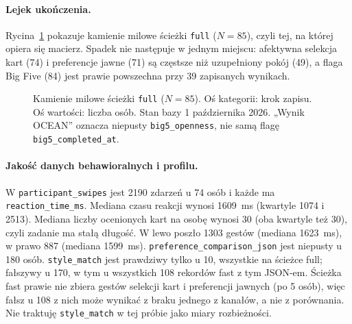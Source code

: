\paragraph{Lejek ukończenia.}
Rycina~\ref{fig:ch08:funnel} pokazuje kamienie milowe ścieżki \texttt{full} ($N=85$), czyli tej, na której opiera się macierz. Spadek nie następuje w jednym miejscu: afektywna selekcja kart (74) i preferencje jawne (71) są częstsze niż uzupełniony pokój (49), a flaga Big Five (84) jest prawie powszechna przy 39 zapisanych wynikach.

\begin{figure}[htbp]
  \centering
  \caption{Kamienie milowe ścieżki \texttt{full} ($N=85$). Oś kategorii: krok zapisu. Oś wartości: liczba osób. Stan bazy 1 października 2026. „Wynik OCEAN” oznacza niepusty \texttt{big5\_openness}, nie samą flagę \texttt{big5\_completed\_at}.}
  \label{fig:ch08:funnel}
\end{figure}

\paragraph{Jakość danych behawioralnych i profilu.}
W \texttt{participant\_swipes} jest 2190 zdarzeń u 74 osób i każde ma \texttt{reaction\_time\_ms}. Mediana czasu reakcji wynosi 1609~ms (kwartyle 1074 i 2513). Mediana liczby ocenionych kart na osobę wynosi 30 (oba kwartyle też 30), czyli zadanie ma stałą długość. W lewo poszło 1303 gestów (mediana 1623~ms), w prawo 887 (mediana 1599~ms).
\texttt{preference\_comparison\_json} jest niepusty u 180 osób. \texttt{style\_match} jest prawdziwy tylko u 10, wszystkie na ścieżce full; fałszywy u 170, w tym u wszystkich 108 rekordów fast z tym JSON-em. Ścieżka fast prawie nie zbiera gestów selekcji kart i preferencji jawnych (po 5 osób), więc fałsz u 108 z nich może wynikać z braku jednego z kanałów, a nie z porównania. Nie traktuję \texttt{style\_match} w tej próbie jako miary rozbieżności.

